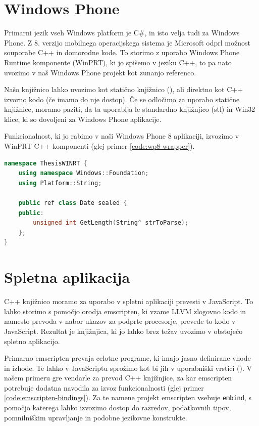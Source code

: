 \section{Windows Phone}

Primarni jezik vseh Windows platform je C\#, in isto velja tudi za Windows Phone. Z 8. verzijo mobilnega operacijskega sistema je Microsoft odprl možnost souporabe C++ in domorodne kode. To storimo z uporabo Windows Phone Runtime komponente (WinPRT), ki jo spišemo v jeziku C++, to pa nato uvozimo v naš Windows Phone projekt kot zunanjo referenco.

Našo knjižnico lahko uvozimo kot statično knjižnico (), ali direktno kot C++ izvorno kodo (če imamo do nje dostop). Če se odločimo za uporabo statične knjižnice, moramo paziti, da ta uporablja le standardno knjižnjico (\gls{stl}) in Win32 klice, ki so dovoljeni za Windows Phone aplikacije\cite{windows-static}.

Funkcionalnost, ki jo rabimo v naši Windows Phone 8 aplikaciji, izvozimo v WinPRT C++ komponenti (glej primer \ref{code:wp8-wrapper}).

\lstset{language=[Sharp]C, breaklines}
\begin{lstlisting}[caption={C++ koda za izvoz funckionalnosti knjižnice v JavaScript razreda \texttt{Date}.}, label=code:wp8-wrapper, language=c++]
namespace ThesisWINRT {
    using namespace Windows::Foundation;
    using Platform::String;

    public ref class Date sealed {
    public:
        unsigned int GetLength(String^ strToParse);
    };
}
\end{lstlisting}

\section{Spletna aplikacija}

C++ knjižnico moramo za uporabo v spletni aplikaciji prevesti v JavaScript. To lahko storimo s pomočjo orodja emscripten, ki vzame LLVM zlogovno kodo in namesto prevoda v nabor ukazov za podprte procesorje, prevede to kodo v JavaScript. Rezultat je knjižnjica, ki jo lahko brez težav uvozimo v obstoječo spletno aplikacijo.

Primarno emscripten prevaja celotne programe, ki imajo jasno definirane vhode in izhode. Te lahko v JavaScriptu sprožimo kot bi jih v uporabniški vrstici (). V našem primeru gre vendarle za prevod C++ knjižnjice, za kar emscripten potrebuje dodatna navodila za izvoz funkcionalnosti (glej primer \ref{code:emscripten-bindings}). Za te namene projekt emscripten vsebuje \texttt{embind}\cite{emscripten-embind}, s pomočjo katerega lahko izvozimo dostop do razredov, podatkovnih tipov, pomnilniškim upravljanje in podobne jezikovne konstrukte.

